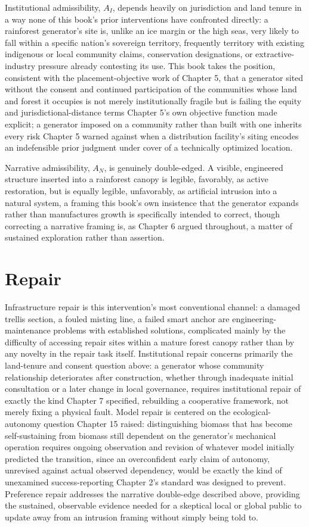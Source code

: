 \documentclass[11pt,oneside]{book}
\begin{document}
Institutional admissibility, $A_I$, depends heavily on jurisdiction and land tenure in a way none of this book's prior interventions have confronted directly: a rainforest generator's site is, unlike an ice margin or the high seas, very likely to fall within a specific nation's sovereign territory, frequently territory with existing indigenous or local community claims, conservation designations, or extractive-industry pressure already contesting its use. This book takes the position, consistent with the placement-objective work of Chapter 5, that a generator sited without the consent and continued participation of the communities whose land and forest it occupies is not merely institutionally fragile but is failing the equity and jurisdictional-distance terms Chapter 5's own objective function made explicit; a generator imposed on a community rather than built with one inherits every risk Chapter 5 warned against when a distribution facility's siting encodes an indefensible prior judgment under cover of a technically optimized location.

Narrative admissibility, $A_N$, is genuinely double-edged. A visible, engineered structure inserted into a rainforest canopy is legible, favorably, as active restoration, but is equally legible, unfavorably, as artificial intrusion into a natural system, a framing this book's own insistence that the generator expands rather than manufactures growth is specifically intended to correct, though correcting a narrative framing is, as Chapter 6 argued throughout, a matter of sustained exploration rather than assertion.

\section*{Repair}

Infrastructure repair is this intervention's most conventional channel: a damaged trellis section, a fouled misting line, a failed smart anchor are engineering-maintenance problems with established solutions, complicated mainly by the difficulty of accessing repair sites within a mature forest canopy rather than by any novelty in the repair task itself. Institutional repair concerns primarily the land-tenure and consent question above: a generator whose community relationship deteriorates after construction, whether through inadequate initial consultation or a later change in local governance, requires institutional repair of exactly the kind Chapter 7 specified, rebuilding a cooperative framework, not merely fixing a physical fault. Model repair is centered on the ecological-autonomy question Chapter 15 raised: distinguishing biomass that has become self-sustaining from biomass still dependent on the generator's mechanical operation requires ongoing observation and revision of whatever model initially predicted the transition, since an overconfident early claim of autonomy, unrevised against actual observed dependency, would be exactly the kind of unexamined success-reporting Chapter 2's standard was designed to prevent. Preference repair addresses the narrative double-edge described above, providing the sustained, observable evidence needed for a skeptical local or global public to update away from an intrusion framing without simply being told to.
\end{document}
